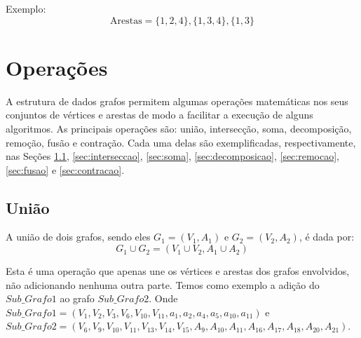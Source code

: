 Exemplo:
\[
\text{Arestas} = \{1,2,4\}, \{1,3,4\}, \{1,3\}
\]

\chapter{Operações}\label{cap:operacoes}

A estrutura de dados grafos permitem algumas operações matemáticas nos seus conjuntos de vértices e arestas de modo a facilitar a execução de alguns algoritmos. As principais operações são: união, intersecção, soma, decomposição, remoção, fusão e contração. Cada uma delas são exemplificadas, respectivamente, nas Seções \ref{sec:uniao}, \ref{sec:interseccao}, \ref{sec:soma}, \ref{sec:decomposicao}, \ref{sec:remocao}, \ref{sec:fusao} e \ref{sec:contracao}.

\section{União}\label{sec:uniao}
A união de dois grafos, sendo eles $G_1 = (V_1, A_1)$ e $G_2 = (V_2, A_2)$, é dada por:
\[
	G_1 \cup G_2 = (V_1 \cup V_2, A_1 \cup A_2)
\]

Esta é uma operação que apenas une os vértices e arestas dos grafos envolvidos, não adicionando nenhuma outra parte.
Temos como exemplo a adição do $Sub\_Grafo1$ ao grafo $Sub\_Grafo2$.
Onde $Sub\_Grafo1 = (V_1, V_2, V_3, V_6, V_{10}, V_{11}, a_1, a_2, a_4, a_5, a_{10}, a_{11} )$ e $Sub\_Grafo2 = (V_6, V_9, V_{10}, V_{11}, V_{13}, V_{14}, V_{15}, A_{9}, A_{10}, A_{11}, A_{16}, A_{17}, A_{18}, A_{20}, A_{21})$.

